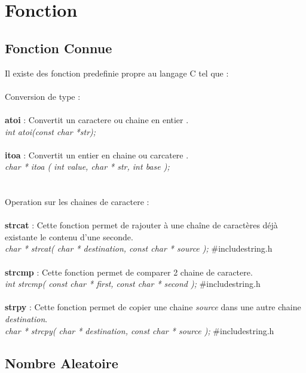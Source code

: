 \documentclass[a4paper,12pt,openany]{book}
\begin{document}
{%

\chapter{Fonction}

\section{Fonction Connue}

Il existe des fonction predefinie propre au langage C tel que :\\
\\
Conversion de type : \\
\\
\textbf{atoi} : Convertit un caractere ou chaine en entier .  \\
\emph{int atoi(const char *str);}  \\
\\
\textbf{itoa} : Convertit un entier en chaine ou carcatere .\\
\emph{char *  itoa ( int value, char * str, int base );}\\
\\
\\
Operation sur les chaines de caractere : \\
\\
\textbf{strcat} : Cette fonction permet de rajouter à une chaîne de caractères déjà existante le contenu d'une seconde.\\
\emph{char * strcat( char * destination, const char * source );}  \#include\<string.h\> \\
\\
\textbf{strcmp} : Cette fonction permet de comparer 2 chaine de caractere.\\
\emph{int strcmp( const char * first, const char * second );} \#include\<string.h\> \\
\\
\textbf{strpy} : Cette fonction permet de copier une chaine \emph{source} dans une autre chaine \emph{destination}.\\
\emph{char * strcpy( char * destination, const char * source );} \#include\<string.h\> \\



\section{Nombre Aleatoire}

}
\end{document}
